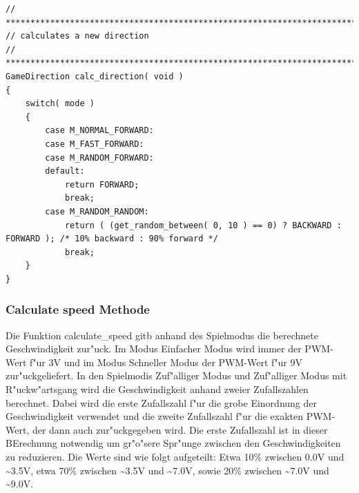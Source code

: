 \vspace{0.5cm}
\begin{lstlisting}[caption={Calculate direction},label=lst:calcdirection]
// ****************************************************************************
// calculates a new direction
// ***************************************************************************/
GameDirection calc_direction( void )
{
	switch( mode )
	{
		case M_NORMAL_FORWARD:
		case M_FAST_FORWARD:
		case M_RANDOM_FORWARD:
		default:
			return FORWARD;
			break;
		case M_RANDOM_RANDOM:
			return ( (get_random_between( 0, 10 ) == 0) ? BACKWARD : FORWARD ); /* 10% backward : 90% forward */
			break;
	}
}
\end{lstlisting}
\vspace{0.5cm}

\subsubsection{Calculate speed Methode}

Die Funktion calculate\_speed gitb anhand des Spielmodus die berechnete Geschwindigkeit zur"uck.
Im Modus \grqq{}Einfacher Modus\grqq{} wird immer der PWM-Wert f"ur 3V und im Modus \grqq{}Schneller Modus\grqq{} der PWM-Wert f"ur 9V zur"uckgeliefert.
In den Spielmodis \grqq{}Zuf"alliger Modus\grqq{} und \grqq{}Zuf"alliger Modus mit R"uckw"artsgang\grqq{} wird die Geschwindigkeit anhand zweier Zufallszahlen berechnet.
Dabei wird die erste Zufallszahl f"ur die grobe Einordnung der Geschwindigkeit verwendet und die zweite Zufallszahl f"ur die exakten PWM-Wert, der dann auch zur"uckgegeben wird. Die erste Zufallszahl ist in dieser BErechnung notwendig um gr"o"sere Spr"unge zwischen den Geschwindigkeiten zu reduzieren. 
Die Werte sind wie folgt aufgeteilt: Etwa 10\% zwischen 0.0V und \~{}3.5V, etwa 70\% zwischen \~{}3.5V und \~{}7.0V, sowie 20\% zwischen \~{}7.0V und \~{}9.0V. 


